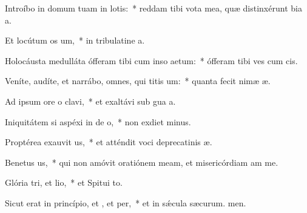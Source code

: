 \item Introíbo in domum tuam in lotis:~* reddam tibi vota mea, quæ distinxérunt bia a.
\item Et locútum  os um,~* in tribulatine a.
\item Holocáusta medulláta ófferam tibi cum inso aetum:~* ófferam tibi ves cum cis.
\item Veníte, audíte, et narrábo, omnes, qui titis um:~* quanta fecit nimæ æ.
\item Ad ipsum ore o clavi,~* et exaltávi sub gua a.
\item Iniquitátem si aspéxi in de o,~* non exdiet minus.
\item Proptérea exauvit us,~* et atténdit voci deprecatinis æ.
\item Benetus us,~* qui non amóvit oratiónem meam, et misericórdiam am  me.
\item Glória tri, et lio,~* et Spitui to.
\item Sicut erat in princípio, et , et per,~* et in sǽcula sæcurum. men.
